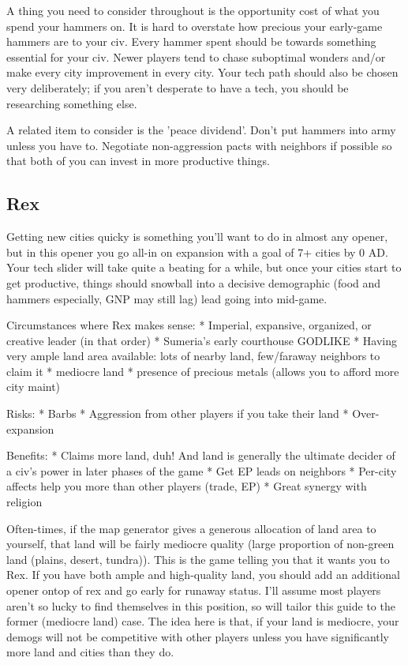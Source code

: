 \documentclass[10pt]{article}
\begin{document}
A thing you need to consider throughout is the opportunity cost of what you spend your hammers on. It is
hard to overstate how precious your early-game hammers are to your civ. Every hammer spent should be
towards something essential for your civ. Newer players tend to chase suboptimal wonders and/or make every city
improvement in every city. Your tech path should also be chosen very deliberately; if you aren't desperate
to have a tech, you should be researching something else.

A related item to consider is the 'peace dividend'. Don't put hammers into army unless you have to. Negotiate
non-aggression pacts with neighbors if possible so that both of you can invest in more productive things.

\subsection*{Rex}

Getting new cities quicky is something you'll want to do in almost any opener, but in this
opener you go all-in on expansion with a goal of 7+ cities by 0 AD. Your tech slider will take
quite a beating for a while, but once your cities start to get productive, things should snowball
into a decisive demographic (food and hammers especially, GNP may still lag) lead going into mid-game.

Circumstances where Rex makes sense:
* Imperial, expansive, organized, or creative leader (in that order)
* Sumeria's early courthouse GODLIKE
* Having very ample land area available: lots of nearby land, few/faraway neighbors to claim it
* mediocre land
* presence of precious metals (allows you to afford more city maint)

Risks:
* Barbs
* Aggression from other players if you take their land
* Over-expansion

Benefits:
* Claims more land, duh! And land is generally the ultimate decider of a civ's power in later phases of the game
* Get EP leads on neighbors
* Per-city affects help you more than other players (trade, EP)
* Great synergy with religion

Often-times, if the map generator gives a generous allocation of land
area to yourself, that land will be fairly mediocre quality (large
proportion of non-green land (plains, desert, tundra)).  This is the
game telling you that it wants you to Rex. If you have both ample and
high-quality land, you should add an additional opener ontop of rex
and go early for runaway status. I'll assume most players aren't so
lucky to find themselves in this position, so will tailor this guide
to the former (mediocre land) case.  The idea here is that, if your
land is mediocre, your demogs will not be competitive with other
players unless you have significantly more land and cities than they
do.
\end{document}
